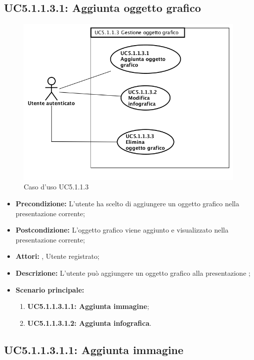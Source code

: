 \subsection{ UC5.1.1.3.1: Aggiunta oggetto grafico}

\begin{figure}[h]
	\begin{center}
	\includegraphics[scale=0.4]{diagram/UC5-1-1-3.png}
	\caption{Caso d'uso UC5.1.1.3}
	\end{center}
\end{figure}
\begin{itemize}
	\item \textbf{Precondizione:} L'utente ha scelto di aggiungere un oggetto grafico nella presentazione corrente;
	\item \textbf{Postcondizione:} L'oggetto grafico viene aggiunto e visualizzato nella presentazione corrente;
	\item \textbf{Attori:} , Utente registrato;
	\item \textbf{Descrizione:} L'utente può aggiungere un oggetto grafico alla presentazione ;
	\item \textbf{Scenario principale:}
	\begin{enumerate}
		\item \textbf{ UC5.1.1.3.1.1: Aggiunta immagine};
		\item \textbf{ UC5.1.1.3.1.2: Aggiunta infografica}.
	\end{enumerate}
\end{itemize}
\subsection{ UC5.1.1.3.1.1: Aggiunta immagine}

